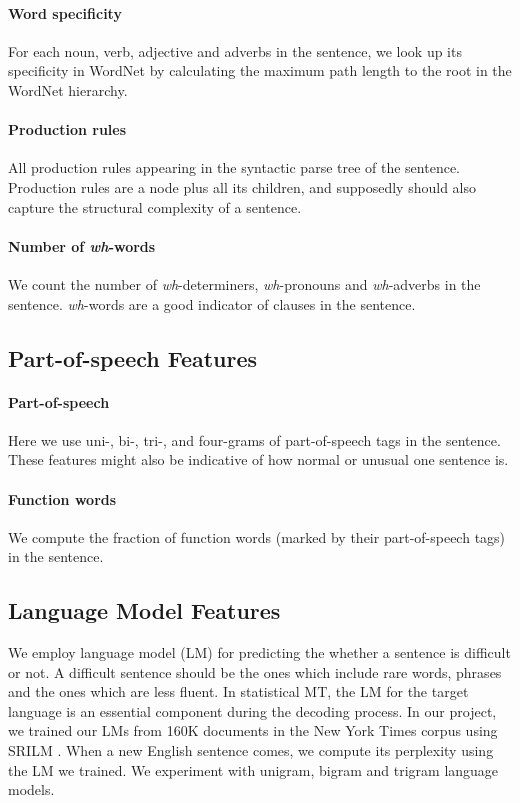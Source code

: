 \documentclass[11pt]{article}
\begin{document}
\paragraph{Word specificity} For each noun, verb, adjective and adverbs in the sentence, we look up its specificity in WordNet by calculating the maximum path length to the root in the WordNet hierarchy.
\paragraph{Production rules} All production rules appearing in the syntactic parse tree of the sentence. Production rules are a node plus all its children, and supposedly should also capture the structural complexity of a sentence.
\paragraph{Number of {\em wh}-words} We count the number of {\em wh}-determiners, {\em wh}-pronouns and {\em wh}-adverbs in the sentence. {\em wh}-words are a good indicator of clauses in the sentence.

\subsection{Part-of-speech Features}
\paragraph{Part-of-speech} Here we use uni-, bi-, tri-, and four-grams of part-of-speech tags in the sentence. These features might also be indicative of how normal or unusual one sentence is.
\paragraph{Function words} We compute the fraction of function words (marked by their part-of-speech tags) in the sentence.

\subsection{Language Model Features}
We employ language model (LM) for predicting the whether a sentence is difficult or not.
A difficult sentence should be the ones which include rare words, phrases and the ones which are less fluent.
In statistical MT, the LM for the target language is an essential component during the decoding process. 
In our project, we trained our LMs from 160K documents in the New York Times corpus \cite{nytcorpus} using SRILM \cite{SRILM}. 
When a new English sentence comes, we compute its perplexity using the LM we trained. 
We experiment with unigram, bigram and trigram language models. 
\end{document}
